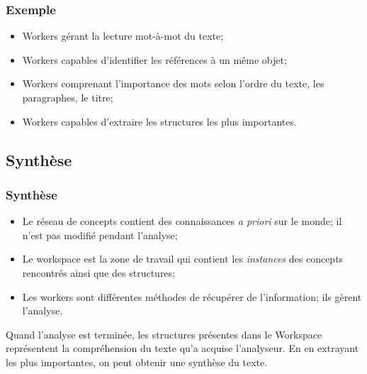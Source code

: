 \documentclass{beamer}
\begin{document}
        \begin{frame}
        \frametitle{Exemple}
            \begin{itemize}
                \item Workers gérant la lecture mot-à-mot du texte;
                \item Workers capables d'identifier les références à un même objet;
                \item Workers comprenant l'importance des mots selon l'ordre du texte, les paragraphes, le titre;
                \item Workers capables d'extraire les structures les plus importantes.
            \end{itemize}
        \end{frame}

    \subsection{Synthèse}
        \begin{frame}
        \frametitle{Synthèse}
            \begin{itemize}
                \item Le réseau de concepts contient des connaissances \textit{a priori} sur le monde; il n'est pas modifié pendant l'analyse;
                \item Le workspace est la zone de travail qui contient les \textit{instances} des concepts rencontrés ainsi que des structures;
                \item Les workers sont différentes méthodes de récupérer de l'information; ils gèrent l'analyse.
            \end{itemize}
            Quand l'analyse est terminée, les structures présentes dans le Workspace représentent la compréhension du texte qu'a acquise l'analyseur.
            En en extrayant les plus importantes, on peut obtenir une synthèse du texte.
        \end{frame}
\end{document}
